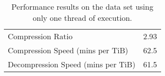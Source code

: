 \begin{table}
    \caption{\label{tab:vbz} Performance results on the data set using only one thread of execution.}
	\begin{tabular}{|l|l|}
        \hline
Compression Ratio & 2.93\\
		Compression Speed (mins per TiB) & 62.5\\

		Decompression Speed (mins per TiB) & 61.5\\
	\hline
    \end{tabular}
\end{table}
